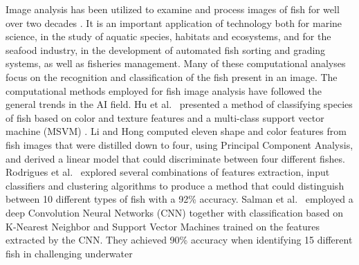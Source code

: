 \documentclass[screen,review]{acmart}
\begin{document}
Image analysis has been utilized to examine and process images of fish
for well over two decades \cite{Zion2000InvivoFS,Saberioon2017ApplicationOM}. It is an important
application of technology both for marine science, in the study of aquatic
species, habitats and ecosystems, and for the seafood industry, in the
development of automated fish sorting and grading systems, as well as
fisheries management. Many of these computational analyses focus on
the recognition and classification 
of the fish present in an image.  The computational methods employed for
fish image analysis have followed the general trends in the AI field.
Hu et al.~\cite{HuJing2012Fscb} presented a method of classifying species
of fish based on color and texture features and a multi-class support
vector machine (MSVM) \cite{Vapnik1999AOS}.
Li and Hong \cite{Li2014IdentificationOF} computed eleven shape and color
features from fish images that were distilled down to four, using Principal
Component Analysis, and derived a linear model
that could discriminate between four different fishes.
Rodrigues et al.~\cite{RodriguesMarcoT.A2015Ecda} explored several
combinations of features extraction, input classifiers and clustering
algorithms to produce a method that could distinguish between 10 different
types of fish with a 92\% accuracy.
Salman et al.~\cite{Salman2016FishSC} employed a deep Convolution Neural
Networks (CNN) \cite{LeCun2004LMG} together with classification based on
K-Nearest Neighbor and Support Vector Machines trained on the features
extracted by the CNN. They achieved 90\%
accuracy when identifying 15 different fish in challenging underwater
\end{document}
